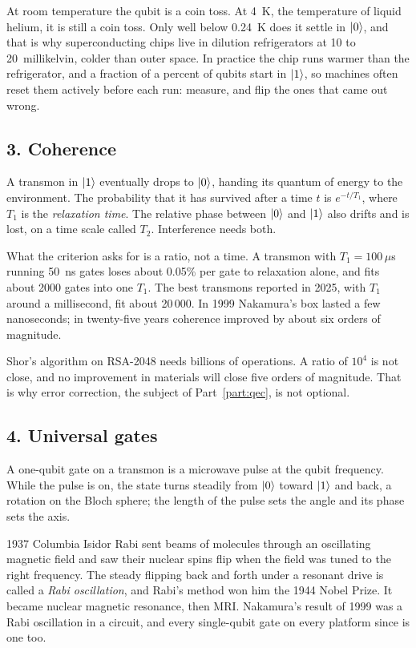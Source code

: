 At room temperature the qubit is a coin toss. At 4~K, the temperature of liquid helium,
it is still a coin toss. Only well below 0.24~K does it settle in $\ket0$, and that is
why superconducting chips live in dilution refrigerators at 10 to 20~millikelvin, colder
than outer space. In practice the chip runs warmer than the refrigerator, and a fraction
of a percent of qubits start in $\ket1$, so machines often reset them actively before
each run: measure, and flip the ones that came out wrong.

\subsection*{3. Coherence}

A transmon in $\ket1$ eventually drops to $\ket0$, handing its quantum of energy to the
environment. The probability that it has survived after a time $t$ is $e^{-t/T_1}$, where
$T_1$ is the \emph{relaxation time}. The relative phase between $\ket0$ and $\ket1$ also
drifts and is lost, on a time scale called $T_2$. Interference needs both.

What the criterion asks for is a ratio, not a time. A transmon with $T_1 = 100\,\mu$s
running 50~ns gates loses about 0.05\% per gate to relaxation alone, and fits about 2000
gates into one $T_1$. The best transmons reported in 2025, with $T_1$ around a
millisecond, fit about 20\,000. In 1999 Nakamura's box lasted a few nanoseconds; in
twenty-five years coherence improved by about six orders of magnitude.

Shor's algorithm on RSA-2048 needs billions of operations. A ratio of $10^4$ is not
close, and no improvement in materials will close five orders of magnitude. That is why
error correction, the subject of Part~\ref{part:qec}, is not optional.

\subsection*{4. Universal gates}

A one-qubit gate on a transmon is a microwave pulse at the qubit frequency. While the
pulse is on, the state turns steadily from $\ket0$ toward $\ket1$ and back, a rotation on
the Bloch sphere; the length of the pulse sets the angle and its phase sets the axis.

\begin{history}{1937 \textperiodcentered{} Columbia}
Isidor Rabi sent beams of molecules through an oscillating magnetic field and saw their
nuclear spins flip when the field was tuned to the right frequency. The steady flipping
back and forth under a resonant drive is called a \emph{Rabi oscillation}, and Rabi's
method won him the 1944 Nobel Prize. It became nuclear magnetic resonance, then MRI.
Nakamura's result of 1999 was a Rabi oscillation in a circuit, and every single-qubit gate
on every platform since is one too.
\end{history}

